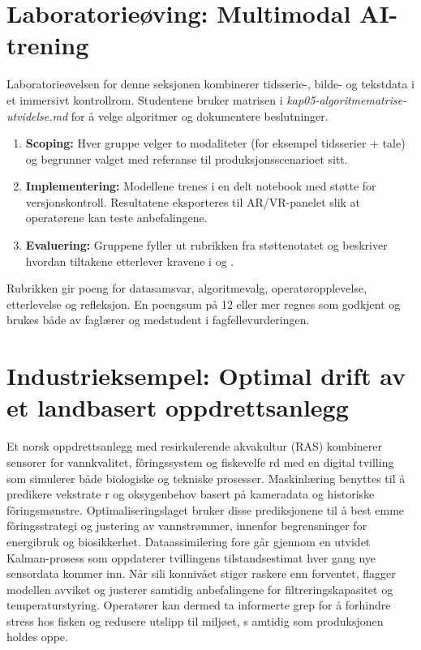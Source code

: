\section{Laboratorieøving: Multimodal AI-trening}
Laboratorieøvelsen for denne seksjonen kombinerer tidsserie-, bilde- og tekstdata i et immersivt kontrollrom. Studentene bruker matrisen i \textit{kap05-algoritmematrise-utvidelse.md} for å velge algoritmer og dokumentere beslutninger.

\begin{enumerate}
    \item \textbf{Scoping:} Hver gruppe velger to modaliteter (for eksempel tidsserier + tale) og begrunner valget med referanse til produksjonsscenarioet sitt.
    \item \textbf{Implementering:} Modellene trenes i en delt notebook med støtte for versjonskontroll. Resultatene eksporteres til AR/VR-panelet slik at operatørene kan teste anbefalingene.
    \item \textbf{Evaluering:} Gruppene fyller ut rubrikken fra støttenotatet og beskriver hvordan tiltakene etterlever kravene i \citet{iec62443-2-1} og \citet{eu2022nis2}.
\end{enumerate}

Rubrikken gir poeng for datasamsvar, algoritmevalg, operatøropplevelse, etterlevelse og refleksjon. En poengsum på 12 eller mer regnes som godkjent og brukes både av faglærer og medstudent i fagfellevurderingen.

\section{Industrieksempel: Optimal drift av et landbasert oppdrettsanlegg}
Et norsk oppdrettsanlegg med resirkulerende akvakultur (RAS) kombinerer sensorer for vannkvalitet, fôringssystem og fiskevelfe
rd med en digital tvilling som simulerer både biologiske og tekniske prosesser. Maskinlæring benyttes til å predikere vekstrate
r og oksygenbehov basert på kameradata og historiske fôringsmønstre. Optimaliseringslaget bruker disse prediksjonene til å best
emme fôringsstrategi og justering av vannstrømmer, innenfor begrensninger for energibruk og biosikkerhet. Dataassimilering fore
går gjennom en utvidet Kalman-prosess som oppdaterer tvillingens tilstandsestimat hver gang nye sensordata kommer inn. Når sili
konnivået stiger raskere enn forventet, flagger modellen avviket og justerer samtidig anbefalingene for filtreringskapasitet og
temperaturstyring. Operatører kan dermed ta informerte grep for å forhindre stress hos fisken og redusere utslipp til miljøet, s
amtidig som produksjonen holdes oppe.

